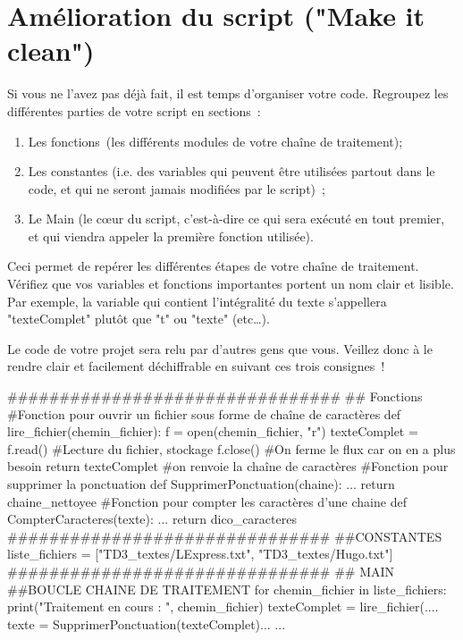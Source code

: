 \section{Amélioration du script ("Make it clean")}

Si vous ne l'avez pas déjà fait, il est temps d'organiser votre code. Regroupez les différentes parties de votre script en sections : 
\begin{enumerate}
  \item  Les fonctions (les différents modules de votre chaîne de traitement);
  \item  Les constantes (i.e. des variables qui peuvent être utilisées partout dans le code, et qui ne seront jamais modifiées par le script) ;
  \item  Le Main (le cœur du script, c'est-à-dire ce qui sera exécuté en tout premier, et qui viendra appeler la première fonction utilisée). 
\end{enumerate}

 Ceci permet de repérer les différentes étapes de votre chaîne de traitement.
Vérifiez que vos variables et fonctions importantes portent un nom clair et lisible. Par exemple, la variable qui contient l'intégralité du texte s'appellera "texteComplet" plutôt que "t" ou "texte" (etc\dots).

Le code de votre projet sera relu par d'autres gens que vous. Veillez donc à le rendre clair et facilement déchiffrable en suivant ces trois consignes !

\begin{python}
################################
## Fonctions
#Fonction pour ouvrir un fichier sous forme de chaîne de caractères
def lire_fichier(chemin_fichier):
  f = open(chemin_fichier, "r")
  texteComplet = f.read() #Lecture du fichier, stockage 
  f.close()    #On ferme le flux car on en a plus besoin
  return texteComplet #on renvoie la chaîne de caractères
#Fonction pour supprimer la ponctuation
def SupprimerPonctuation(chaine):
  ...
  return chaine_nettoyee
#Fonction pour compter les caractères d'une chaine
def CompterCaracteres(texte):
  ...
  return dico_caracteres
###############################
##CONSTANTES
liste_fichiers = ["TD3_textes/LExpress.txt", "TD3_textes/Hugo.txt"]
###############################
## MAIN
##BOUCLE CHAINE DE TRAITEMENT
for chemin_fichier in liste_fichiers:
  print("Traitement en cours : ", chemin_fichier)
  texteComplet = lire_fichier(....
  texte = SupprimerPonctuation(texteComplet)...
  ...
\end{python}
